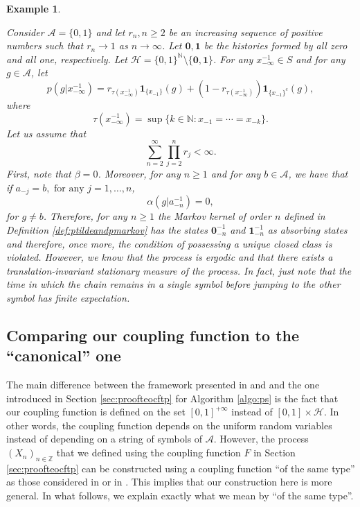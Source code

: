 \documentclass[a4paper]{article}
\newtheorem{example}[theorem]{Example}
\newcommand{\Z}{\mathbb{Z}}
\newcommand{\N}{\mathbb{N}}
\renewcommand{\H}{\mathcal{H}}
\newcommand{\A}{\mathcal{A}}
\begin{document}
\begin{example} \label{ex:cantuseouralgorithms}

Consider $\A=\{0,1\}$ and let $r_n, n\geq 2$  be an increasing sequence of positive numbers such that $r_n\to 1$ as $n\to \infty$. Let $\mathbf{0,1} $ be the histories formed by all zero and all one, respectively. Let $\H= \{0,1\}^\N \setminus \{ \mathbf {0,1} \}$.
For any $x_{-\infty}^{-1}\in S$ and for any $g\in \A$, let
\begin{equation}
    p(g | x^{-1}_{-\infty})=
r_{\tau(x^{-1}_{-\infty})}\mathbf{1}_{\{x_{-1}\}}(g)+(1-r_{\tau(x^{-1}_{-\infty})})\mathbf{1}_{\{x_{-1}\}^c}(g),
 \label{esempio2}
\end{equation}
where
\[
\tau(x^{-1}_{-\infty}) = \sup\{ k\in \N : x_{-1} = \cdots = x_{-k}\}.
\]
Let us assume that
$$
\sum_{n=2}^{\infty}\prod_{j=2}^nr_j<\infty.
$$
First, note that $\beta=0$. Moreover, for any $n\geq 1$ and for any $b\in \A$, we have that if $a_{-j}=b, \text{ for any } j=1,\ldots,n$,
$$
\alpha(g|a^{-1}_{-n})=0,
$$
for $g\neq b$. Therefore, for any $n \geq 1$ the Markov kernel of order $n$
defined in Definition \ref{def:ptildeandpmarkov} has the states $\mathbf{0}^{-1}_{-n}$ and $\mathbf{1}^{-1}_{-n}$ as absorbing states and therefore, once more, the condition of possessing a unique closed class is violated. %
However, we know that the process is ergodic and that there exists a translation-invariant stationary measure of the process. In fact, just note that the time in which the chain remains in a single symbol before jumping to the other symbol has finite expectation.
\end{example}
\subsection{Comparing our coupling function to the ``canonical'' one
}\label{sec:cc}
The main difference between the framework presented in \cite{cff} and \cite{desantispiccioni} and the one introduced in Section \ref{sec:proofteocftp} for Algorithm \ref{algo:ps} is the fact that our coupling function is defined on the set $[0,1]^{+\infty}$ instead of $[0,1]\times \H$. In other words, the coupling function depends on the uniform random variables instead of depending on a string of symbols of $\A$. However, the process $(X_n)_{n\in \Z}$ that we defined using the coupling function $F$ in Section \ref{sec:proofteocftp} can be constructed using a coupling function ``of the same type'' as those considered in %
\cite{cff} or in \cite{desantispiccioni}. This implies that our construction here is more general. 
In what follows, we explain exactly what we mean by ``of the same type''.
\end{document}
